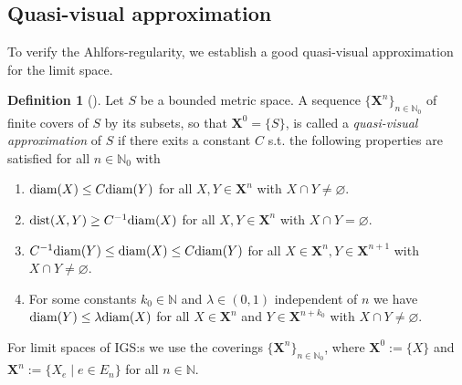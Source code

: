 \documentclass{amsart}
\newcommand{\diam}{{\rm diam}}
\newcommand{\dist}{{\rm dist}}
\numberwithin{equation}{section}
\theoremstyle{definition}
\newtheorem{definition}[equation]{Definition}
\theoremstyle{remark}
\newcommand{\N}{\mathbb{N}}
\begin{document}
\subsection{Quasi-visual approximation}
    To verify the Ahlfors-regularity, we establish a good quasi-visual approximation for the limit space.

\begin{definition}[{\cite[Definition 2.1]{bonkmeyer}}]
    Let \(S\) be a bounded metric space. A sequence \(\{\mathbf{X}^n\}_{n\in\N_0}\) of finite covers of \(S\) by its subsets, so that \(\mathbf{X}^0=\{S\}\), is called a \emph{quasi-visual approximation} of \(S\) if there exits a constant $C$ s.t. the following properties are satisfied for all \(n\in\N_0\) with 
        \begin{enumerate}
            \item[(i)] \(\diam(X)\leq  C\diam(Y)\) for all \(X,Y\in \mathbf{X}^n\) with \(X\cap Y \neq \varnothing\).
            \vspace{2pt}
            \item[(ii)] \(\dist(X,Y)\geq C^{-1}\diam(X)\) for all \(X,Y\in \mathbf{X}^n\) with \(X\cap Y=\varnothing\).
            \vspace{2pt}
            \item[(iii)] \(C^{-1} \diam(Y)\leq \diam(X)\leq C \diam(Y)\) for all \(X\in \mathbf{X}^n,Y\in \mathbf{X}^{n+1}\) with \(X\cap Y\neq\varnothing\).
            \vspace{2pt}
            \item[(iv)] For some constants \(k_0\in \N\) and \(\lambda\in (0,1)\) independent of \(n\) we have \(\diam(Y)\leq \lambda \diam(X)\) for all \(X\in\mathbf{X}^n\) and \(Y\in \mathbf{X}^{n+k_0}\) with \(X\cap Y\neq \varnothing\).
        \end{enumerate}
\end{definition}

For limit spaces of IGS:s we use the coverings \(\{\mathbf{X}^n\}_{n\in\N_0}\), where \(\mathbf{X}^0:=\{X\}\) and \(\mathbf{X}^n:=\{X_e\mid e\in E_n\}\) for all \(n\in\N\). 
\end{document}
